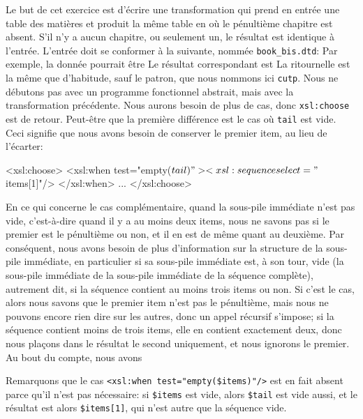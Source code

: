 Le but de cet exercice est d'écrire une transformation \XSLT qui prend
en entrée une table des matières et produit la même table en \XML où
le pénultième chapitre est absent. S'il n'y a aucun chapitre, ou
seulement un, le résultat est identique à l'entrée. L'entrée doit se
conformer à la \DTD suivante, nommée \texttt{book\_bis.dtd}:
\noindent Par exemple, la donnée pourrait être
\noindent Le résultat correspondant est
\noindent La ritournelle \XSLT est la même que d'habitude, sauf le
patron, que nous nommons ici \texttt{cutp}. Nous ne débutons pas avec
un programme fonctionnel abstrait, mais avec la transformation
précédente. Nous aurons besoin de plus de cas, donc
\texttt{xsl:choose} est de retour. Peut-être que la première
différence est le cas où \texttt{tail} est vide. Ceci signifie que
nous avons besoin de conserver le premier item, au lieu de l'écarter:
\begin{sverb}
    <xsl:choose>
      <xsl:when test="empty($tail)">
        <xsl:sequence select="$items[1]"/>
      </xsl:when>
      ...
    </xsl:choose>
\end{sverb}
En ce qui concerne le cas complémentaire, quand la sous-pile immédiate
n'est pas vide, c'est-à-dire quand il y a au moins deux items, nous ne
savons pas si le premier est le pénultième ou non, et il en est de
même quant au deuxième. Par conséquent, nous avons besoin de plus
d'information sur la structure de la sous-pile immédiate, en
particulier si sa sous-pile immédiate est, à son tour, vide (la
sous-pile immédiate de la sous-pile immédiate de la séquence
complète), autrement dit, si la séquence contient au moins trois items
ou non. Si c'est le cas, alors nous savons que le premier item n'est
pas le pénultième, mais nous ne pouvons encore rien dire sur les
autres, donc un appel récursif s'impose; si la séquence contient moins
de trois items, elle en contient exactement deux, donc nous plaçons
dans le résultat le second uniquement, et nous ignorons le premier. Au
bout du compte, nous avons
Remarquons que le cas \texttt{<xsl:when test="empty(\$items)"/>} est
en fait absent parce qu'il n'est pas nécessaire: si \texttt{\$items}
est vide, alors \texttt{\$tail} est vide aussi, et le résultat est
alors \texttt{\$items[1]}, qui n'est autre que la séquence vide.

